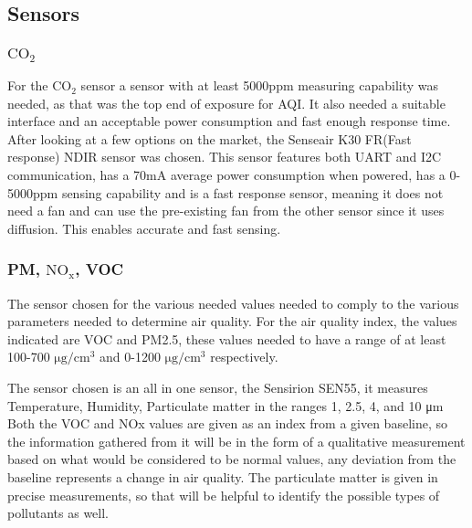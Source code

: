 \subsection{Sensors}
\subsubsection{$\mathrm{CO_2}$}
For the $\mathrm{CO_2}$ sensor a sensor with at least 5000ppm measuring capability was needed, as that was the top end of exposure for AQI. It also needed a suitable interface and an acceptable power consumption and fast enough response time.
After looking at a few options on the market, the Senseair K30 FR(Fast response) NDIR sensor was chosen. This sensor features both UART and I2C communication, has a 70mA average power consumption when powered, has a 0-5000ppm sensing capability and is a fast response sensor, meaning it does not need a fan and can use the pre-existing fan from the other sensor since it uses diffusion. This enables accurate and fast sensing.
\subsubsection{PM, $\mathrm{NO_x}$, VOC}
The sensor chosen for the various needed values needed to comply to the various parameters needed to determine air quality. For the air quality index, the values indicated are VOC and PM2.5, these values needed to have a range of at least 100-700 $ \si{\micro\gram}/\si{\centi\meter^3} $ and 0-1200  $ \si{\micro\gram}/\si{\centi\meter^3} $ respectively.

\noindent
The sensor chosen is an all in one sensor, the Sensirion SEN55, it measures Temperature, Humidity, Particulate matter in the ranges 1, 2.5, 4, and 10 \si{\micro\meter}
Both the VOC and NOx values are given as an index from a given baseline, so the information gathered from it will be in the form of a qualitative measurement based on what would be considered to be normal values, any deviation from the baseline represents a change in air quality. The particulate matter is given in precise measurements, so that will be helpful to identify the possible types of pollutants as well.




